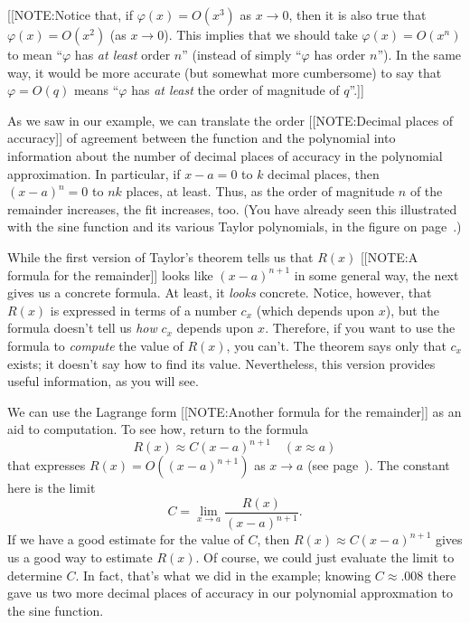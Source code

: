 [[NOTE:Notice that, if $\varphi(x) = O(x^3)$ as $x \to 0$, then it is also true that $\varphi(x) = O(x^2)$ (as $x \to 0$).  This implies that we should take $\varphi(x) = O(x^n)$ to mean ``$\varphi$ has {\em at least\/} order $n$'' (instead of simply ``$\varphi$ has order $n$'').  In the same way, it would be more accurate (but somewhat more cumbersome) to say that $\varphi = O(q)$ means ``$\varphi$ has {\em at least\/} the order of magnitude of $q$''.]]

As we saw in our example, we can translate the order  
[[NOTE:Decimal places  of accuracy]]        
of agreement between the function and the polynomial into information
about the number of decimal places of accuracy in the polynomial
approximation.  In particular, if $x - a = 0$ to $k$ decimal places,
then $(x - a)^n = 0$ to $nk$ places, at least.  Thus, as the order of
magnitude $n$ of the remainder increases, the fit increases, too.
(You have already seen this illustrated with the sine function and its
various Taylor polynomials, in the figure on page~\pageref{sin3}.)

While the first version of Taylor's theorem tells us that $R(x)$ 
[[NOTE:A formula for  the remainder]]       
looks like $(x - a)^{n+1}$ in some general way, the next gives us a
concrete formula.  At least, it {\em looks\/} concrete.  Notice,
however, that $R(x)$ is expressed in terms of a number $c_x$ (which
depends upon $x$), but the formula doesn't tell us {\em how\/} $c_x$
depends upon $x$.  Therefore, if you want to use the formula to {\em
  compute\/} the value of $R(x)$, you can't.  The theorem says only
that $c_x$ exists; it doesn't say how to find its value.
Nevertheless, this version provides useful information, as you will
see.
\begin{center}
\end{center}

We can use the Lagrange form 
[[NOTE:Another formula for the remainder]]   
as an aid to computation.  To see how, return to the formula 
        \[
R(x) \approx C (x - a)^{n+1} \quad (x \approx a)
\]
that expresses $R(x) = O((x - a)^{n+1})$ as $x \to a$ (see page~\pageref{order}).  The constant here is the limit
        \[
C = \lim_{x \to a} \dfrac{R(x)}{(x - a)^{n+1}}.
\]
If we have a good estimate for the value of $C$, then $R(x) \approx C (x - a)^{n+1}$ gives us a good way to estimate $R(x)$.   Of course, we could just evaluate the limit to determine $C$.  In fact, that's what we did in the example; knowing $C \approx .008$ there gave us two more decimal places of accuracy in our polynomial approxmation to the sine function.   

